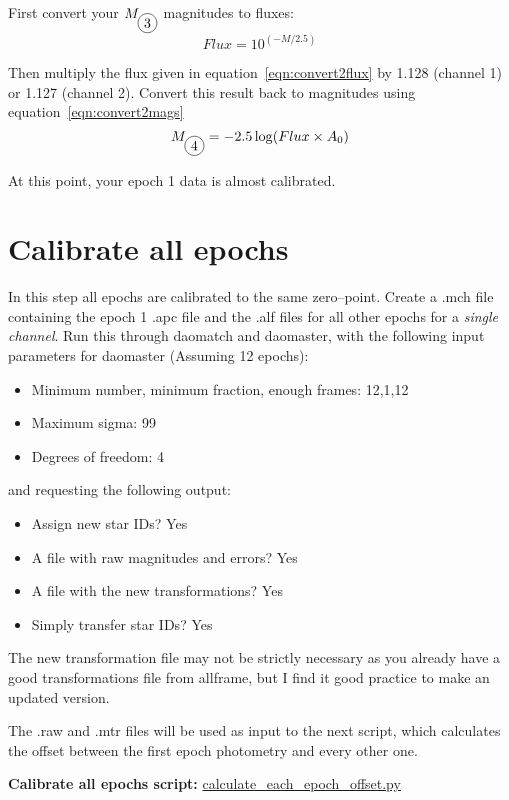 \documentclass[11pt]{article}
\newcommand*\circled[1]{\tikz[baseline=(char.base)]{
            \node[shape=circle,draw,inner sep=2pt] (char) {#1};}}
\begin{document}
First convert your $M_{\circled{3}}$ magnitudes to fluxes:
\begin{equation}
Flux = 10^{(-M / 2.5)}
\end{equation}
\label{eqn:convert2flux}

Then multiply the flux given in equation~\ref{eqn:convert2flux} by 1.128 (channel 1) or 1.127 (channel 2). Convert this result back to magnitudes using equation~\ref{eqn:convert2mags}
\begin{equation}
M_{\circled{4}} = -2.5 \log (Flux \times A_0)
\end{equation}
\label{eqn:convert2mags}

At this point, your epoch 1 data is almost calibrated. 

\section{Calibrate all epochs}
\label{sec:calibrateall}
In this step all epochs are calibrated to the same zero--point. Create a .mch file containing the epoch 1 .apc file and the .alf files for all other epochs for a {\it single channel}. Run this through daomatch and daomaster, with the following input parameters for daomaster (Assuming 12 epochs):
\begin{itemize}
\item Minimum number, minimum fraction, enough frames: 12,1,12
\item Maximum sigma: 99
\item Degrees of freedom: 4
\end{itemize}

and requesting the following output:
\begin{itemize}
\item Assign new star IDs? Yes
\item A file with raw magnitudes and errors? Yes
\item A file with the new transformations? Yes
\item  Simply transfer star IDs? Yes
\end{itemize}

The new transformation file may not be strictly necessary as you already have a good transformations file from allframe, but I find it good practice to make an updated version.

The .raw and .mtr files will be used as input to the next script, which calculates the offset between the first epoch photometry and every other one.

{\bf Calibrate all epochs script:} \href{https://github.com/vickyscowcroft/smhash_code/blob/master/calculate_each_epoch_offset.py}{calculate\_each\_epoch\_offset.py}
\end{document}
